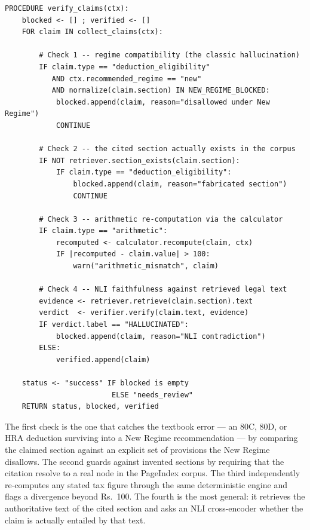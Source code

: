 \begin{lstlisting}[style=pseudo]
PROCEDURE verify_claims(ctx):
    blocked <- [] ; verified <- []
    FOR claim IN collect_claims(ctx):

        # Check 1 -- regime compatibility (the classic hallucination)
        IF claim.type == "deduction_eligibility"
           AND ctx.recommended_regime == "new"
           AND normalize(claim.section) IN NEW_REGIME_BLOCKED:
            blocked.append(claim, reason="disallowed under New Regime")
            CONTINUE

        # Check 2 -- the cited section actually exists in the corpus
        IF NOT retriever.section_exists(claim.section):
            IF claim.type == "deduction_eligibility":
                blocked.append(claim, reason="fabricated section")
                CONTINUE

        # Check 3 -- arithmetic re-computation via the calculator
        IF claim.type == "arithmetic":
            recomputed <- calculator.recompute(claim, ctx)
            IF |recomputed - claim.value| > 100:
                warn("arithmetic_mismatch", claim)

        # Check 4 -- NLI faithfulness against retrieved legal text
        evidence <- retriever.retrieve(claim.section).text
        verdict  <- verifier.verify(claim.text, evidence)
        IF verdict.label == "HALLUCINATED":
            blocked.append(claim, reason="NLI contradiction")
        ELSE:
            verified.append(claim)

    status <- "success" IF blocked is empty
                         ELSE "needs_review"
    RETURN status, blocked, verified
\end{lstlisting}

The first check is the one that catches the textbook error --- an 80C, 80D, or
HRA deduction surviving into a New Regime recommendation --- by comparing the
claimed section against an explicit set of provisions the New Regime disallows.
The second guards against invented sections by requiring that the citation
resolve to a real node in the PageIndex corpus. The third independently
re-computes any stated tax figure through the same deterministic engine and
flags a divergence beyond Rs.~100. The fourth is the most general: it retrieves
the authoritative text of the cited section and asks an NLI cross-encoder
whether the claim is actually entailed by that text.

